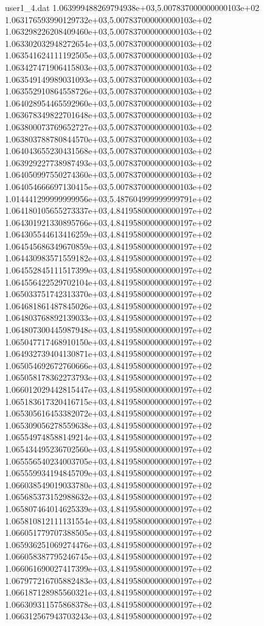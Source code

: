 \begin{filecontents}{user1_4.dat}
1.063999488269794938e+03,5.007837000000000103e+02
1.063176593990129732e+03,5.007837000000000103e+02
1.063298226208409460e+03,5.007837000000000103e+02
1.063302032948272654e+03,5.007837000000000103e+02
1.063541624111192505e+03,5.007837000000000103e+02
1.063427471906415803e+03,5.007837000000000103e+02
1.063549149989031093e+03,5.007837000000000103e+02
1.063552910864558726e+03,5.007837000000000103e+02
1.064028954465592960e+03,5.007837000000000103e+02
1.063678349822701648e+03,5.007837000000000103e+02
1.063800073769652727e+03,5.007837000000000103e+02
1.063803788780844570e+03,5.007837000000000103e+02
1.064043655230431568e+03,5.007837000000000103e+02
1.063929227738987493e+03,5.007837000000000103e+02
1.064050997550274360e+03,5.007837000000000103e+02
1.064054666697130415e+03,5.007837000000000103e+02
1.014441299999999956e+03,5.487604999999999791e+02
1.064180105655273337e+03,4.841958000000000197e+02
1.064301921330895766e+03,4.841958000000000197e+02
1.064305544613416259e+03,4.841958000000000197e+02
1.064545686349670859e+03,4.841958000000000197e+02
1.064430983571559182e+03,4.841958000000000197e+02
1.064552845111517399e+03,4.841958000000000197e+02
1.064556422529702104e+03,4.841958000000000197e+02
1.065033751742313370e+03,4.841958000000000197e+02
1.064681861487845026e+03,4.841958000000000197e+02
1.064803768892139033e+03,4.841958000000000197e+02
1.064807300445987948e+03,4.841958000000000197e+02
1.065047717468910150e+03,4.841958000000000197e+02
1.064932739404130871e+03,4.841958000000000197e+02
1.065054692672760666e+03,4.841958000000000197e+02
1.065058178362273793e+03,4.841958000000000197e+02
1.066012029442815447e+03,4.841958000000000197e+02
1.065183617320416715e+03,4.841958000000000197e+02
1.065305616453382072e+03,4.841958000000000197e+02
1.065309056278559638e+03,4.841958000000000197e+02
1.065549748588149214e+03,4.841958000000000197e+02
1.065434495236702560e+03,4.841958000000000197e+02
1.065556540234003705e+03,4.841958000000000197e+02
1.065559934194845709e+03,4.841958000000000197e+02
1.066038549019033780e+03,4.841958000000000197e+02
1.065685373152988632e+03,4.841958000000000197e+02
1.065807464014625339e+03,4.841958000000000197e+02
1.065810812111131554e+03,4.841958000000000197e+02
1.066051779707388505e+03,4.841958000000000197e+02
1.065936251069274476e+03,4.841958000000000197e+02
1.066058387795246745e+03,4.841958000000000197e+02
1.066061690027417399e+03,4.841958000000000197e+02
1.067977216705882483e+03,4.841958000000000197e+02
1.066187128985560321e+03,4.841958000000000197e+02
1.066309311575868378e+03,4.841958000000000197e+02
1.066312567943703243e+03,4.841958000000000197e+02

\end{filecontents}
